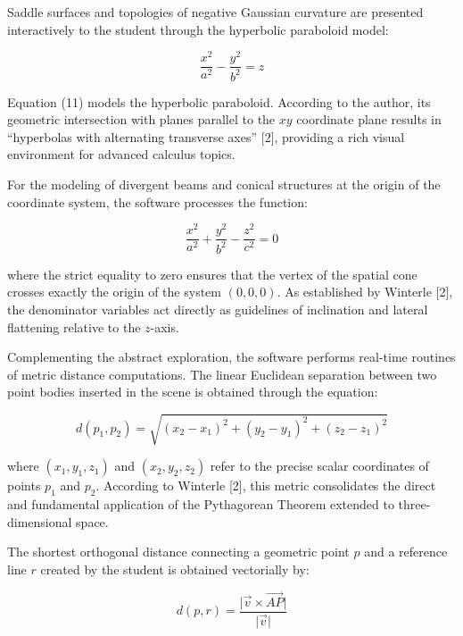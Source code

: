 \documentclass[conference,a4paper]{IEEEtran}
\begin{document}
Saddle surfaces and topologies of negative Gaussian curvature are presented interactively to the student through the hyperbolic paraboloid model:

\begin{equation}
\frac{x^2}{a^2}-\frac{y^2}{b^2} = z \tag{11}
\end{equation}

Equation (11) models the hyperbolic paraboloid. According to the author, its geometric intersection with planes parallel to the $xy$ coordinate plane results in ``hyperbolas with alternating transverse axes'' [2], providing a rich visual environment for advanced calculus topics.

For the modeling of divergent beams and conical structures at the origin of the coordinate system, the software processes the function:

\begin{equation}
\frac{x^2}{a^2}+\frac{y^2}{b^2}-\frac{z^2}{c^2} = 0 \tag{12}
\end{equation}

where the strict equality to zero ensures that the vertex of the spatial cone crosses exactly the origin of the system $(0,0,0)$. As established by Winterle [2], the denominator variables act directly as guidelines of inclination and lateral flattening relative to the $z$-axis.

Complementing the abstract exploration, the software performs real-time routines of metric distance computations. The linear Euclidean separation between two point bodies inserted in the scene is obtained through the equation:

\begin{equation}
d(p_1,p_2) = \sqrt{(x_2-x_1)^2+(y_2-y_1)^2+(z_2-z_1)^2} \tag{13}
\end{equation}

where $(x_1, y_1, z_1)$ and $(x_2, y_2, z_2)$ refer to the precise scalar coordinates of points $p_1$ and $p_2$. According to Winterle [2], this metric consolidates the direct and fundamental application of the Pythagorean Theorem extended to three-dimensional space.

The shortest orthogonal distance connecting a geometric point $p$ and a reference line $r$ created by the student is obtained vectorially by:

\begin{equation}
d(p,r) = \frac{\lvert \vec{v}\times \vec{AP}\rvert}{\lvert \vec{v}\rvert} \tag{14}
\end{equation}
\end{document}
